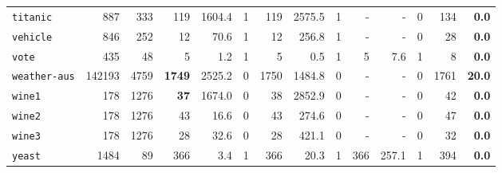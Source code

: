 \begin{tabular}{lccrrrrrrrrrrr}
\texttt{titanic} & \multicolumn{1}{r}{887} & \multicolumn{1}{r}{333}  & 119 & 1604.4 & 1 & 119 & 2575.5 & 1 & - & - & 0 & 134 & \textbf{0.0}\\
\texttt{vehicle} & \multicolumn{1}{r}{846} & \multicolumn{1}{r}{252}  & 12 & 70.6 & 1 & 12 & 256.8 & 1 & - & - & 0 & 28 & \textbf{0.0}\\
\texttt{vote} & \multicolumn{1}{r}{435} & \multicolumn{1}{r}{48}  & 5 & 1.2 & 1 & 5 & 0.5 & 1 & 5 & 7.6 & 1 & 8 & \textbf{0.0}\\
\texttt{weather-aus} & \multicolumn{1}{r}{142193} & \multicolumn{1}{r}{4759}  & \textbf{1749} & 2525.2 & 0 & 1750 & 1484.8 & 0 & - & - & 0 & 1761 & \textbf{20.0}\\
\texttt{wine1} & \multicolumn{1}{r}{178} & \multicolumn{1}{r}{1276}  & \textbf{37} & 1674.0 & 0 & 38 & 2852.9 & 0 & - & - & 0 & 42 & \textbf{0.0}\\
\texttt{wine2} & \multicolumn{1}{r}{178} & \multicolumn{1}{r}{1276}  & 43 & 16.6 & 0 & 43 & 274.6 & 0 & - & - & 0 & 47 & \textbf{0.0}\\
\texttt{wine3} & \multicolumn{1}{r}{178} & \multicolumn{1}{r}{1276}  & 28 & 32.6 & 0 & 28 & 421.1 & 0 & - & - & 0 & 32 & \textbf{0.0}\\
\texttt{yeast} & \multicolumn{1}{r}{1484} & \multicolumn{1}{r}{89}  & 366 & 3.4 & 1 & 366 & 20.3 & 1 & 366 & 257.1 & 1 & 394 & \textbf{0.0}\\
\bottomrule
\end{tabular}
